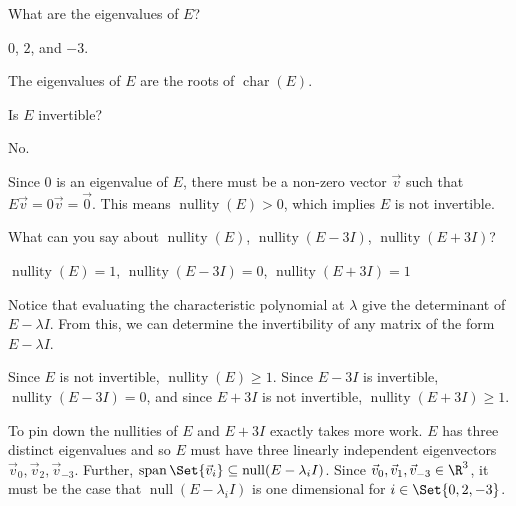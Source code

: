 \documentclass{problemset}
\DeclareMathOperator{\Span}{span}
\DeclareMathOperator{\Null}{null}
\DeclareMathOperator{\Nullity}{nullity}
\DeclareMathOperator{\chr}{char}
\begin{document}
	\begin{parts}
		\item What are the eigenvalues of $E$?
			\begin{solution}
				$0$, $2$, and $-3$. 

				The eigenvalues of $E$ are the roots of $\chr(E)$. 
			\end{solution}
		\item Is $E$ invertible?
			\begin{solution}
				No. 

				Since $0$ is an eigenvalue of $E$, there must be a non-zero vector
				$\vec v$ such that $E\vec v=0\vec v=\vec 0$. This means $\Nullity(E)>0$,
				which implies $E$ is not invertible. 
			\end{solution}
		\item What can you say about $\Nullity(E)$, $\Nullity(E-3I)$, $\Nullity(E+3I)$?
			\begin{solution}
				$\Nullity(E)=1$, $\Nullity(E-3I)=0$, $\Nullity(E+3I)=1$

				Notice that evaluating the characteristic polynomial at $\lambda$
				give the determinant of $E-\lambda I$. From this, we can determine the
				invertibility of any matrix of the form $E-\lambda I$.

				Since $E$ is not invertible, $\Nullity(E)\geq 1$. Since $E-3I$ is
				invertible, $\Nullity(E-3I)=0$, and since $E+3I$ is not invertible,
				$\Nullity(E+3I)\geq 1$.

				To pin down the nullities of $E$ and $E+3I$ exactly takes more work.
				$E$ has three distinct eigenvalues and so $E$ must have three linearly
				independent eigenvectors $\vec v_0,\vec v_2,\vec v_{-3}$. Further, $\Span\Set{\vec v_i}\subseteq 
				\Null(E-\lambda_i I)$.				
				Since $\vec v_0,\vec v_1,\vec v_{-3}\in\R^3$, it must be the case that $\Null(E-\lambda_i I)$ is one
				dimensional for $i\in\Set{0,2,-3}$.
			\end{solution}
	\end{parts}
\end{document}
